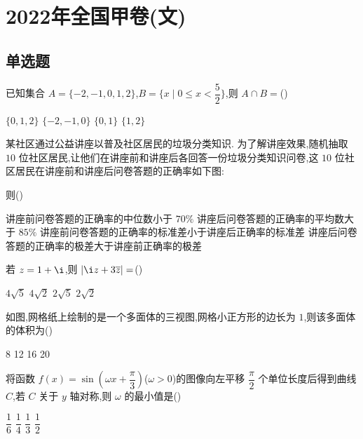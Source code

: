 \chapter{2022年全国甲卷(文)}

\section{单选题}

\begin{problem}
已知集合 \(A=\{-2,-1,0,1,2\}\),\(B=\{x\mid 0\le x<\dfrac{5}{2}\}\),则 \(A\cap B=\)(\quad)

\choices
    {\(\{0,1,2\}\)}
    {\(\{-2,-1,0\}\)}
    {\(\{0,1\}\)}
    {\(\{1,2\}\)}
\end{problem}

\begin{problem}
某社区通过公益讲座以普及社区居民的垃圾分类知识. 为了解讲座效果,随机抽取 \(10\) 位社区居民,让他们在讲座前和讲座后各回答一份垃圾分类知识问卷,这 \(10\) 位社区居民在讲座前和讲座后问卷答题的正确率如下图:


则(\quad)

\choices
    {讲座前问卷答题的正确率的中位数小于 \(70\%\)}
    {讲座后问卷答题的正确率的平均数大于 \(85\%\)}
    {讲座前问卷答题的正确率的标准差小于讲座后正确率的标准差}
    {讲座后问卷答题的正确率的极差大于讲座前正确率的极差}
\end{problem}

\begin{problem}
若 \(z=1+\i\),则 \(\left|\i z+3\overline{z}\right|=\)(\quad)

\choices
    {\(4\sqrt{5}\)}
    {\(4\sqrt{2}\)}
    {\(2\sqrt{5}\)}
    {\(2\sqrt{2}\)}
\end{problem}

\begin{problem}
如图,网格纸上绘制的是一个多面体的三视图,网格小正方形的边长为 \(1\),则该多面体的体积为(\quad)


\choices
    {8}
    {12}
    {16}
    {20}
\end{problem}

\begin{problem}
将函数 \(f(x)=\sin\left(\omega x+\dfrac{\pi}{3}\right)\)(\(\omega>0\))的图像向左平移 \(\dfrac{\pi}{2}\) 个单位长度后得到曲线 \(C\),若 \(C\) 关于 \(y\) 轴对称,则 \(\omega\) 的最小值是(\quad)

\choices
    {\(\dfrac{1}{6}\)}
    {\(\dfrac{1}{4}\)}
    {\(\dfrac{1}{3}\)}
    {\(\dfrac{1}{2}\)}
\end{problem}

